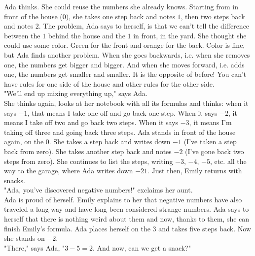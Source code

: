 Ada thinks. 
She could reuse the numbers she already knows. Starting from in front of the house ($0$), she takes one step back and notes $1$, then two steps back and notes $2$. 
The problem, Ada says to herself, is that we can't tell the difference between the $1$ behind the house and the $1$ in front, in the yard. 
She thought she could use some color. 
Green for the front and orange for the back. 
Color is fine, but Ada finds another problem. 
When she goes backwards, i.e. when she removes one, the numbers get bigger and bigger. And when she moves forward, i.e. adds one, the numbers get smaller and smaller.
It is the opposite of before! You can't have rules for one side of the house and other rules for the other side. \\
"We'll end up mixing everything up," says Ada.\\
She thinks again, looks at her notebook with all its formulas and thinks: when it says $-1$, that means I take one off and go back one step. When it says $-2$, it means I take off two and go back two steps. When it says $-3$, it means I'm taking off three and going back three steps. 
Ada stands in front of the house again, on the $0$. She takes a step back and writes down $-1$ (I've taken a step back from zero). She takes another step back and notes $-2$ (I've gone back two steps from zero). She continues to list the steps, writing $-3$, $-4$, $-5$, etc. all the way to the garage, where Ada writes down $-21$. 
Just then, Emily returns with snacks.\\
"Ada, you've discovered negative numbers!" exclaims her aunt.\\
Ada is proud of herself. Emily explains to her that negative numbers have also traveled a long way and have long been considered strange numbers. Ada says to herself that there is nothing weird about them and now, thanks to them, she can finish Emily's formula. Ada places herself on the $3$ and takes five steps back. Now she stands on $-2$.\\
"There," says Ada, "$3 - 5 = 2$. And now, can we get a snack?"

